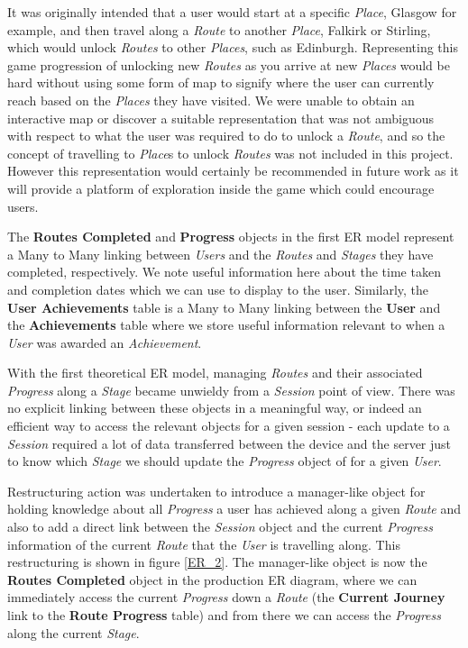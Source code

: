 It was originally intended that a user would start at a
specific \emph{Place}, Glasgow for example, and then travel along a
\emph{Route} to another \emph{Place}, Falkirk or Stirling, which
would unlock \emph{Routes} to other \emph{Places}, such as
Edinburgh. Representing this game progression of unlocking new
\emph{Routes} as you arrive at new \emph{Places} would be hard
without 
using some form of map to signify where the user can currently reach
based on the \emph{Places} they have visited. We were unable to obtain an
interactive map or discover a suitable representation that was not
ambiguous with respect to what the user was required to do to unlock a
\emph{Route}, and so the concept of travelling to \emph{Place}s to
unlock \emph{Routes} was not included in this project. However this
representation would certainly be recommended in future work as it
will provide a platform of exploration inside the game which could
encourage users. 

The \textbf{Routes Completed} and \textbf{Progress} objects in the
first ER model represent a Many to Many linking between \emph{Users}
and the \emph{Routes} and \emph{Stages} they have completed,
respectively. We note useful information here about the time taken and
completion dates which we can use to display to the user. Similarly,
the \textbf{User Achievements} table is a Many to Many linking
between the \textbf{User} and the \textbf{Achievements} table where we
store useful information relevant to when a \emph{User} was awarded an
\emph{Achievement}.

With the first theoretical ER model, managing \emph{Routes} and their 
associated \emph{Progress} along a \emph{Stage} became unwieldy from
a \emph{Session} point of view. There was no explicit linking between
these objects in a meaningful way, or indeed an efficient way to
access the relevant objects for a given session - each update to a
\emph{Session} required a lot of data transferred between the device
and the server just to know which \emph{Stage} we should update the
\emph{Progress} object of for a given \emph{User}.

Restructuring action was undertaken to introduce a manager-like object
for holding knowledge about all \emph{Progress} a user has achieved
along a given \emph{Route} and also to add a direct link between the
\emph{Session} object and the current \emph{Progress} information of
the current \emph{Route} that the \emph{User} is travelling
along. This restructuring is shown in figure \ref{ER_2}. The
manager-like object is now the \textbf{Routes Completed} object in the
production ER diagram, where we can immediately access the current
\emph{Progress} down a \emph{Route} (the \textbf{Current Journey} link
to the \textbf{Route Progress} table) and from there we can access the
\emph{Progress} along the current \emph{Stage}. 

